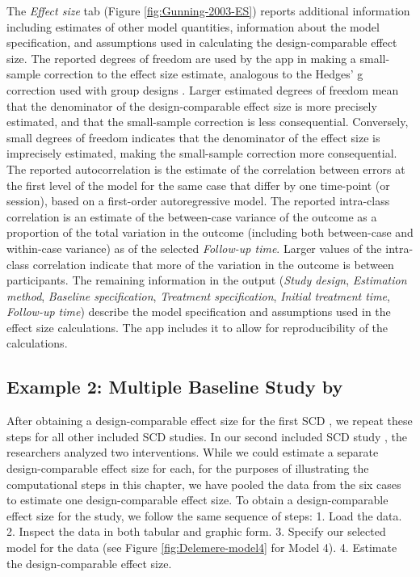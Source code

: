 \documentclass[
]{book}
\begin{document}
The \emph{Effect size} tab (Figure \ref{fig:Gunning-2003-ES}) reports additional information including estimates of other model quantities, information about the model specification, and assumptions used in calculating the design-comparable effect size. The reported degrees of freedom are used by the app in making a small-sample correction to the effect size estimate, analogous to the Hedges' g correction used with group designs \citep{Hedges1981distribution}. Larger estimated degrees of freedom mean that the denominator of the design-comparable effect size is more precisely estimated, and that the small-sample correction is less consequential. Conversely, small degrees of freedom indicates that the denominator of the effect size is imprecisely estimated, making the small-sample correction more consequential. The reported autocorrelation is the estimate of the correlation between errors at the first level of the model for the same case that differ by one time-point (or session), based on a first-order autoregressive model. The reported intra-class correlation is an estimate of the between-case variance of the outcome as a proportion of the total variation in the outcome (including both between-case and within-case variance) as of the selected \emph{Follow-up time}. Larger values of the intra-class correlation indicate that more of the variation in the outcome is between participants. The remaining information in the output (\emph{Study design}, \emph{Estimation method}, \emph{Baseline specification}, \emph{Treatment specification}, \emph{Initial treatment time}, \emph{Follow-up time}) describe the model specification and assumptions used in the effect size calculations. The app includes it to allow for reproducibility of the calculations.

\hypertarget{example-2-multiple-baseline-study-by-delemere2018parentimplemented}{%
\subsection{\texorpdfstring{Example 2: Multiple Baseline Study by \citet{delemere2018ParentImplemented}}{Example 2: Multiple Baseline Study by @delemere2018ParentImplemented}}\label{example-2-multiple-baseline-study-by-delemere2018parentimplemented}}

After obtaining a design-comparable effect size for the first SCD \citep{gunning2003Psychological}, we repeat these steps for all other included SCD studies. In our second included SCD study \citep{delemere2018ParentImplemented}, the researchers analyzed two interventions. While we could estimate a separate design-comparable effect size for each, for the purposes of illustrating the computational steps in this chapter, we have pooled the data from the six cases to estimate one design-comparable effect size. To obtain a design-comparable effect size for the \citet{delemere2018ParentImplemented} study, we follow the same sequence of steps:
1. Load the data.
2. Inspect the data in both tabular and graphic form.
3. Specify our selected model for the data (see Figure \ref{fig:Delemere-model4} for Model 4).
4. Estimate the design-comparable effect size.
\end{document}
